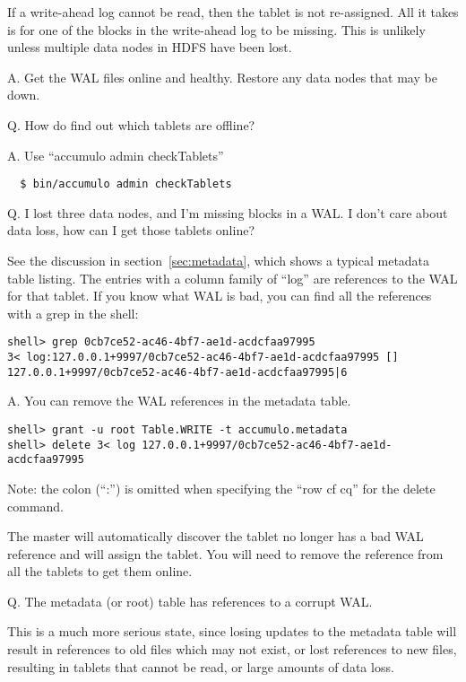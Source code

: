 If a write-ahead log cannot be read, then the tablet is not re-assigned.  All it takes is for one of
the blocks in the write-ahead log to be missing.  This is unlikely unless multiple data nodes in HDFS have been
lost.

A. Get the WAL files online and healthy.  Restore any data nodes that may be down.

Q. How do find out which tablets are offline?

A. Use ``accumulo admin checkTablets''

\begingroup\fontsize{8pt}{8pt}\selectfont\begin{verbatim}
  $ bin/accumulo admin checkTablets
\end{verbatim}\endgroup

Q. I lost three data nodes, and I'm missing blocks in a WAL.  I don't care about data loss, how
can I get those tablets online?

See the discussion in section~\ref{sec:metadata}, which shows a typical metadata table listing.  
The entries with a column family of ``log'' are references to the WAL for that tablet. 
If you know what WAL is bad, you can find all the references with a grep in the shell:

\begingroup\fontsize{8pt}{8pt}\selectfont\begin{verbatim}
shell> grep 0cb7ce52-ac46-4bf7-ae1d-acdcfaa97995
3< log:127.0.0.1+9997/0cb7ce52-ac46-4bf7-ae1d-acdcfaa97995 []    127.0.0.1+9997/0cb7ce52-ac46-4bf7-ae1d-acdcfaa97995|6
\end{verbatim}\endgroup

A. You can remove the WAL references in the metadata table.

\begingroup\fontsize{8pt}{8pt}\selectfont\begin{verbatim}
shell> grant -u root Table.WRITE -t accumulo.metadata
shell> delete 3< log 127.0.0.1+9997/0cb7ce52-ac46-4bf7-ae1d-acdcfaa97995
\end{verbatim}\endgroup

Note: the colon (``:'') is omitted when specifying the ``row cf cq'' for the delete command.

The master will automatically discover the tablet no longer has a bad WAL reference and will
assign the tablet.  You will need to remove the reference from all the tablets to get them 
online.


Q. The metadata (or root) table has references to a corrupt WAL.

This is a much more serious state, since losing updates to the metadata table will result
in references to old files which may not exist, or lost references to new files, resulting
in tablets that cannot be read, or large amounts of data loss.

